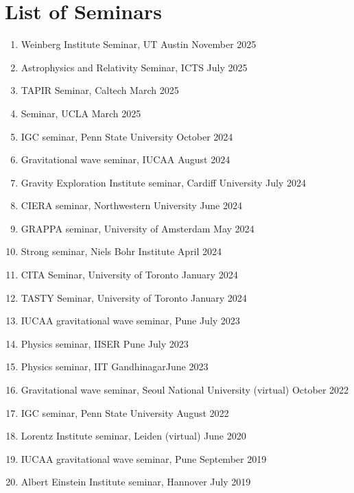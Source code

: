 		\section{List of Seminars}
		\begin{enumerate}[leftmargin=*, nosep]
			\item Weinberg Institute Seminar, UT Austin \hfill November 2025
			\item Astrophysics and Relativity Seminar, ICTS \hfill July 2025
			\item TAPIR Seminar, Caltech  \hfill March 2025
			\item Seminar, UCLA \hfill March 2025
			\item IGC seminar, Penn State University \hfill October 2024
			\item Gravitational wave seminar, IUCAA \hfill August 2024
			\item Gravity Exploration Institute seminar, Cardiff University \hfill July 2024 
			\item CIERA seminar, Northwestern University \hfill June 2024 
			\item GRAPPA seminar, University of Amsterdam \hfill May 2024 
			\item Strong seminar, Niels Bohr Institute \hfill April 2024 
			\item CITA Seminar, University of Toronto \hfill January 2024
			\item TASTY Seminar, University of Toronto \hfill January 2024
			\item IUCAA gravitational wave seminar, Pune \hfill July 2023
			\item Physics seminar, IISER Pune \hfill July 2023
			\item Physics seminar, IIT Gandhinagar\hfill June 2023
			\item Gravitational wave seminar, Seoul National University (virtual) \hfill October 2022 
			\item IGC seminar, Penn State University \hfill August 2022
			\item Lorentz Institute seminar, Leiden (virtual) \hfill June 2020
			\item IUCAA gravitational wave seminar, Pune \hfill September 2019
			\item Albert Einstein Institute seminar, Hannover \hfill July 2019
		\end{enumerate}

